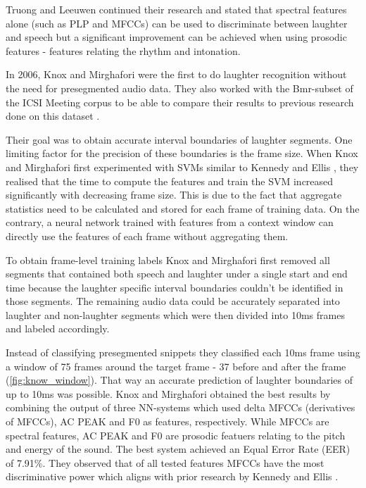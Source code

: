 \documentclass[bsc,frontabs,parskip,deptreport]{infthesis}
\begin{document}
Truong and Leeuwen \cite{truong2007automatic} continued their research and stated that spectral features alone (such as PLP and MFCCs) can be used to discriminate between laughter and speech but a significant improvement can be achieved when using prosodic features - features relating the rhythm and intonation.

In 2006, Knox and Mirghafori \cite{knox2006automatic} were the first to do laughter recognition without the need for presegmented audio data.  
They also worked with the Bmr-subset of the ICSI Meeting corpus \cite{morgan2001meeting} to be able to compare their results to previous research done on this dataset \cite{kennedy2004laughter, truong2005automatic, truong2007automatic}.

Their goal was to obtain accurate interval boundaries of laughter segments.
One limiting factor for the precision of these boundaries is the frame size. 
When Knox and Mirghafori first experimented with SVMs similar to Kennedy and Ellis \cite{kennedy2004laughter}, they realised that the time to compute the features and train the SVM increased significantly with decreasing frame size. 
This is due to the fact that aggregate statistics need to be calculated and stored for each frame of training data.  
On the contrary, a neural network trained with features from a context window can directly use the features of each frame without aggregating them.  

To obtain frame-level training labels Knox and Mirghafori first removed all segments that contained both speech and laughter under a single start and end time because the laughter specific interval boundaries couldn't be identified in those segments. 
The remaining audio data could be accurately separated into laughter and non-laughter segments which were then divided into 10ms frames and labeled accordingly.

Instead of classifying presegmented snippets they classified each 10ms frame using a window of 75 frames around the target frame - 37 before and after the frame (\ref{fig:know_window}).
That way an accurate prediction of laughter boundaries of up to 10ms was possible. 
Knox and Mirghafori obtained the best results by combining the output of three NN-systems which used delta MFCCs (derivatives of MFCCs), AC PEAK and F0 as features, respectively. While MFCCs are spectral features, AC PEAK and F0 are prosodic featuers relating to the pitch and energy of the sound.
The best system achieved an Equal Error Rate (EER) of 7.91\%.
They observed that of all tested features MFCCs have the most discriminative power which aligns with prior research by Kennedy and Ellis \cite{kennedy2004laughter}.
\end{document}
